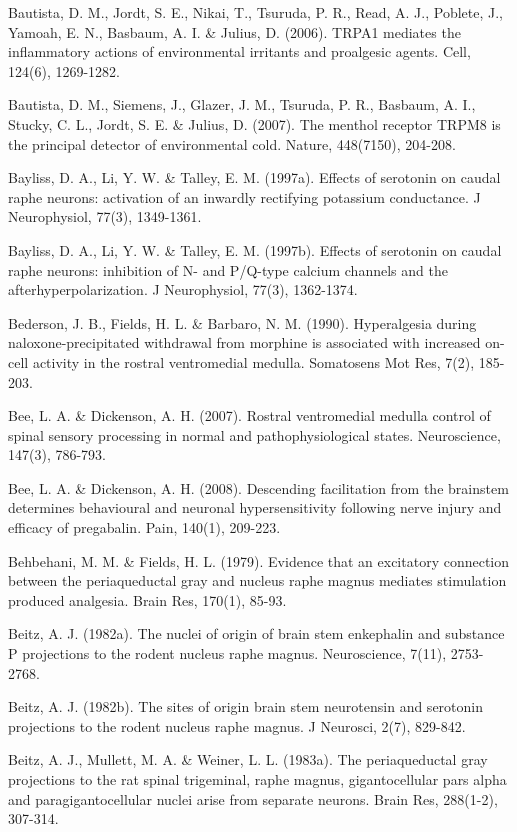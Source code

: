 \documentclass[a4paper,12pt,twoside]{report}
\begin{document}
\begin{singlespacing}
\begin{footnotesize}
Bautista, D. M., Jordt, S. E., Nikai, T., Tsuruda, P. R., Read, A. J., Poblete, J., Yamoah, E. N., Basbaum, A. I. \& Julius, D. (2006). TRPA1 mediates the inflammatory actions of environmental irritants and proalgesic agents. Cell, 124(6), 1269-1282.

Bautista, D. M., Siemens, J., Glazer, J. M., Tsuruda, P. R., Basbaum, A. I., Stucky, C. L., Jordt, S. E. \& Julius, D. (2007). The menthol receptor TRPM8 is the principal detector of environmental cold. Nature, 448(7150), 204-208.

Bayliss, D. A., Li, Y. W. \& Talley, E. M. (1997a). Effects of serotonin on caudal raphe neurons: activation of an inwardly rectifying potassium conductance. J Neurophysiol, 77(3), 1349-1361.

Bayliss, D. A., Li, Y. W. \& Talley, E. M. (1997b). Effects of serotonin on caudal raphe neurons: inhibition of N- and P/Q-type calcium channels and the afterhyperpolarization. J Neurophysiol, 77(3), 1362-1374.

Bederson, J. B., Fields, H. L. \& Barbaro, N. M. (1990). Hyperalgesia during naloxone-precipitated withdrawal from morphine is associated with increased on-cell activity in the rostral ventromedial medulla. Somatosens Mot Res, 7(2), 185-203.

Bee, L. A. \& Dickenson, A. H. (2007). Rostral ventromedial medulla control of spinal sensory processing in normal and pathophysiological states. Neuroscience, 147(3), 786-793.

Bee, L. A. \& Dickenson, A. H. (2008). Descending facilitation from the brainstem determines behavioural and neuronal hypersensitivity following nerve injury and efficacy of pregabalin. Pain, 140(1), 209-223.

Behbehani, M. M. \& Fields, H. L. (1979). Evidence that an excitatory connection between the periaqueductal gray and nucleus raphe magnus mediates stimulation produced analgesia. Brain Res, 170(1), 85-93.

Beitz, A. J. (1982a). The nuclei of origin of brain stem enkephalin and substance P projections to the rodent nucleus raphe magnus. Neuroscience, 7(11), 2753-2768.

Beitz, A. J. (1982b). The sites of origin brain stem neurotensin and serotonin projections to the rodent nucleus raphe magnus. J Neurosci, 2(7), 829-842.

Beitz, A. J., Mullett, M. A. \& Weiner, L. L. (1983a). The periaqueductal gray projections to the rat spinal trigeminal, raphe magnus, gigantocellular pars alpha and paragigantocellular nuclei arise from separate neurons. Brain Res, 288(1-2), 307-314.


\end{footnotesize}
\end{singlespacing}
\end{document}
